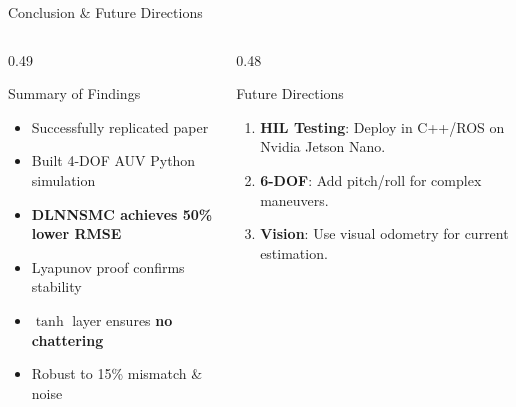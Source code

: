 \documentclass[aspectratio=169,10pt]{beamer}
\begin{document}
\begin{frame}{Conclusion \& Future Directions}
\small 

\begin{columns}[T, onlytextwidth]
  \begin{column}{0.49\textwidth}
    \begin{exampleblock}{Summary of Findings}
      \begin{itemize}
        \item Successfully replicated paper
        \item Built 4-DOF AUV Python simulation
        \item \textbf{DLNNSMC achieves 50\% lower RMSE}
        \item Lyapunov proof confirms stability
        \item $\tanh$ layer ensures \textbf{no chattering}
        \item Robust to 15\% mismatch \& noise
      \end{itemize}
    \end{exampleblock}
  \end{column}

  \hfill

  \begin{column}{0.48\textwidth}
    \begin{block}{Future Directions}
      \footnotesize
      \begin{enumerate}
        \item[\textbf{1.}] \textbf{HIL Testing}: Deploy in C++/ROS on Nvidia Jetson Nano.
        \item[\textbf{2.}] \textbf{6-DOF}: Add pitch/roll for complex maneuvers.
        \item[\textbf{3.}] \textbf{Vision}: Use visual odometry for current estimation.
      \end{enumerate}
    \end{block}
  \end{column}
\end{columns}

\vfill


\end{frame}
\end{document}
